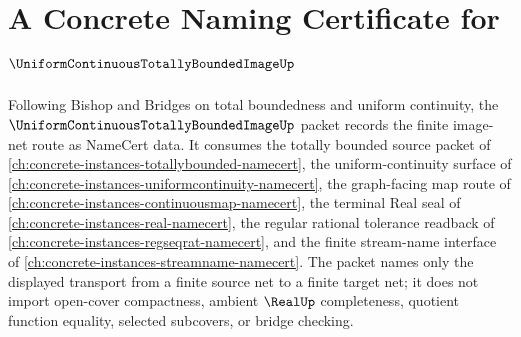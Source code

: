 \chapter{A Concrete Naming Certificate for $\UniformContinuousTotallyBoundedImageUp$}
\label{ch:concrete-instances-uniform-continuous-totally-bounded-image-namecert}

Following Bishop and Bridges on total boundedness and uniform continuity, the $\UniformContinuousTotallyBoundedImageUp$ packet records the finite image-net route as NameCert data. It consumes the totally bounded source packet of \autoref{ch:concrete-instances-totallybounded-namecert}, the uniform-continuity surface of \autoref{ch:concrete-instances-uniformcontinuity-namecert}, the graph-facing map route of \autoref{ch:concrete-instances-continuousmap-namecert}, the terminal Real seal of \autoref{ch:concrete-instances-real-namecert}, the regular rational tolerance readback of \autoref{ch:concrete-instances-regseqrat-namecert}, and the finite stream-name interface of \autoref{ch:concrete-instances-streamname-namecert}. The packet names only the displayed transport from a finite source net to a finite target net; it does not import open-cover compactness, ambient $\RealUp$ completeness, quotient function equality, selected subcovers, or bridge checking.

